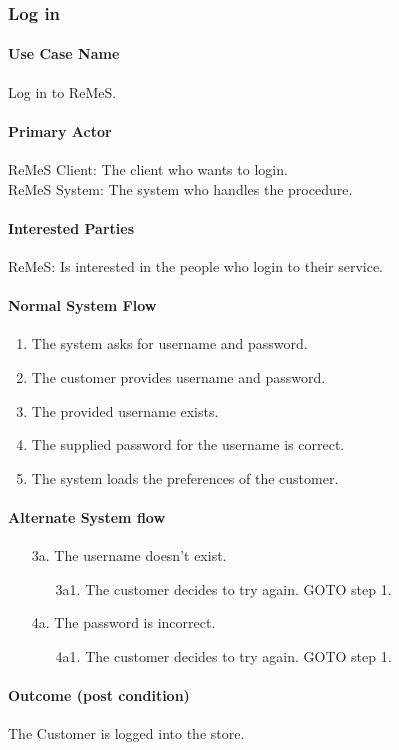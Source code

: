 \subsubsection{Log in}
\paragraph{Use Case Name}
Log in to ReMeS.
\paragraph{Primary Actor}
ReMeS Client: The client who wants to login. \\
ReMeS System: The system who handles the procedure.
\paragraph{Interested Parties}
ReMeS: Is interested in the people who login to their service.
\paragraph{Normal System Flow}
\begin{enumerate}
	\item The system asks for username and password.
	\item The customer provides username and password.
	\item The provided username exists.
	\item The supplied password for the username is correct.
	\item The system loads the preferences of the customer.
\end{enumerate}

\paragraph{Alternate System flow}
\begin{enumerate}
	 \item[3a.] The username doesn't exist.
	\begin{enumerate}
		 \item[3a1.] The customer decides to try again. GOTO step 1.
	\end{enumerate}
	\item[4a.] The password is incorrect.
	\begin{enumerate}
		 \item[4a1.] The customer decides to try again. GOTO step 1.
	\end{enumerate}
\end{enumerate}

\paragraph{Outcome (post condition)}
The Customer is logged into the store.
